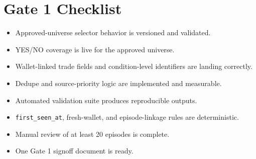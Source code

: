 \documentclass{article}
\begin{document}
\section*{Gate 1 Checklist}
\begin{itemize}
\item Approved-universe selector behavior is versioned and validated.
\item YES/NO coverage is live for the approved universe.
\item Wallet-linked trade fields and condition-level identifiers are landing correctly.
\item Dedupe and source-priority logic are implemented and measurable.
\item Automated validation suite produces reproducible outputs.
\item \texttt{first\_seen\_at}, fresh-wallet, and episode-linkage rules are deterministic.
\item Manual review of at least 20 episodes is complete.
\item One Gate 1 signoff document is ready.
\end{itemize}
\end{document}
